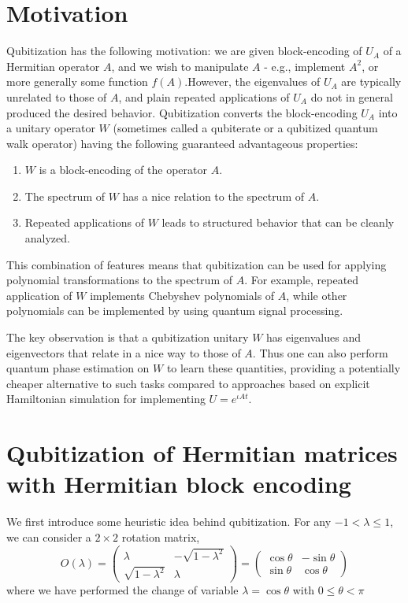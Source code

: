 \documentclass[12pt, oneside]{book}
\theoremstyle{definition}
\theoremstyle{definition}
\theoremstyle{remark}
\begin{document}
\section{Motivation}
Qubitization has the following motivation: we are given block-encoding of $U_A$ of a Hermitian operator $A$, and we wish to manipulate $A$ - e.g., implement $A^2$, or more generally some function $f(A)$.However, the eigenvalues of $U_A$ are typically unrelated to those of $A$, and plain repeated applications of $U_A$ do not in general produced the desired behavior. Qubitization converts the block-encoding $U_A$ into a unitary operator $W$ (sometimes called a qubiterate or a qubitized quantum walk operator) having the following guaranteed advantageous properties:
\begin{enumerate}
    \item $W$ is a block-encoding of the operator $A$.
    \item The spectrum of $W$ has a nice relation to the spectrum of $A$.
    \item Repeated applications of $W$ leads to structured behavior that can be cleanly analyzed.
\end{enumerate}
This combination of features means that qubitization can be used for applying polynomial transformations to the spectrum of $A$. For example, repeated application of $W$ implements Chebyshev polynomials of $A$, while other polynomials can be implemented by using quantum signal processing. 

The key observation is that a qubitization unitary $W$ has eigenvalues and eigenvectors that relate in a nice way to those of $A$. Thus one can also perform quantum phase estimation on $W$ to learn these quantities, providing a potentially cheaper alternative to such tasks compared to approaches based on explicit Hamiltonian simulation for implementing $U=e^{\iota At}$.

\section{Qubitization of Hermitian matrices with Hermitian block encoding}
We first introduce some heuristic idea behind qubitization. For any $-1<\lambda \leq 1$, we can consider a $2\times 2$ rotation matrix,
\[
O(\lambda) =\begin{pmatrix} \lambda & -\sqrt{1-\lambda^2} \\ \sqrt{1-\lambda^2} & \lambda \end{pmatrix} = \begin{pmatrix} \cos \theta & - \sin \theta \\ \sin \theta & \cos \theta \end{pmatrix}
\]
where we have performed the change of variable $\lambda=\cos \theta$ with $0\leq \theta < \pi$
\end{document}
